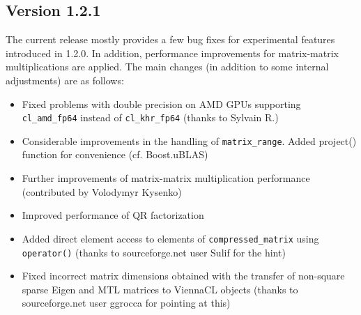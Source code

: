 \subsection*{Version 1.2.1}
The current release mostly provides a few bug fixes for experimental features introduced in 1.2.0.
In addition, performance improvements for matrix-matrix multiplications are applied.
The main changes (in addition to some internal adjustments) are as follows:
\begin{itemize}
 \item Fixed problems with double precision on AMD GPUs supporting \lstinline|cl_amd_fp64| instead of \lstinline|cl_khr_fp64| (thanks to Sylvain R.)
 \item Considerable improvements in the handling of \lstinline|matrix_range|. Added project() function for convenience (cf. Boost.uBLAS)
 \item Further improvements of matrix-matrix multiplication performance (contributed by Volodymyr Kysenko)
 \item Improved performance of QR factorization
 \item Added direct element access to elements of \lstinline|compressed_matrix| using \lstinline|operator()| (thanks to sourceforge.net user Sulif for the hint)
 \item Fixed incorrect matrix dimensions obtained with the transfer of non-square sparse Eigen and MTL matrices to ViennaCL objects (thanks to sourceforge.net user ggrocca for pointing at this)
\end{itemize}





